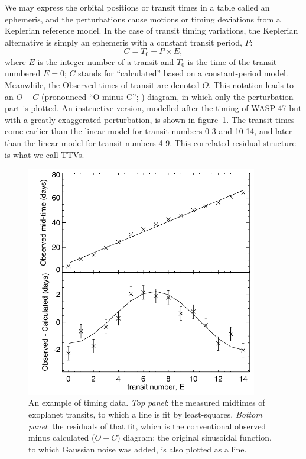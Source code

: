 \documentclass[graybox,natbib,nosecnum]{svmult}
\begin{document}
We may express the orbital positions or transit times in a table called an ephemeris, and the perturbations cause motions or timing deviations from a Keplerian reference model.  In the case of transit timing variations, the Keplerian alternative is simply an ephemeris with a constant transit period, $P$:
\begin{equation}
C = T_0 + P \times E, 
\end{equation}
where $E$ is the integer number of a transit and $T_0$ is the time of the transit numbered $E=0$; $C$ stands for ``calculated'' based on a constant-period model.  Meanwhile, the Observed times of transit are denoted $O$.  This notation leads to an $O-C$ (pronounced ``O minus C''; \citealt{2005Sterken}) diagram, in which only the perturbation part is plotted.  An instructive version, modelled after the timing of WASP-47 \citep{2015Becker} but with a greatly exaggerated perturbation, is shown in figure~\ref{omc}.  The transit times come earlier than the linear model for transit numbers 0-3 and 10-14, and later than the linear model for transit numbers 4-9.  This correlated residual structure is what we call TTVs.

\begin{figure}
\centerline{
\includegraphics[width=0.9\textwidth]{omc.pdf}}
%
\caption{An example of timing data.  \emph{Top panel}: the measured midtimes of exoplanet transits, to which a line is fit by least-squares.  \emph{Bottom panel}: the residuals of that fit, which is the conventional observed minus calculated ($O-C$) diagram; the original sinusoidal function, to which Gaussian noise was added, is also plotted as a line. }
\label{omc}       %
\end{figure}
\end{document}
